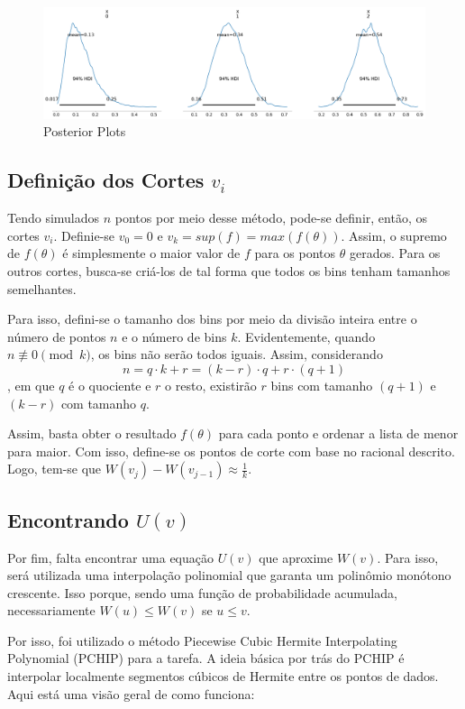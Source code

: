 \documentclass{article}
\begin{document}
\begin{figure}[h]
    \centering
    \includegraphics[width=0.5\linewidth]{Posterior Plots.png}
    \caption{Posterior Plots}
    \label{fig:enter-label}
\end{figure}

\subsection{Definição dos Cortes $v_i$}
Tendo simulados $n$ pontos por meio desse método, pode-se definir, então, os cortes $v_i$. Definie-se $v_0 = 0$ e $v_k = sup(f) = max(f(\theta))$. Assim, o supremo de $f(\theta)$ é simplesmente o maior valor de $f$ para os pontos $\theta$ gerados. Para os outros cortes, busca-se criá-los de tal forma que todos os bins tenham tamanhos semelhantes.

Para isso, defini-se o tamanho dos bins por meio da divisão inteira entre o número de pontos $n$ e o número de bins $k$. Evidentemente, quando $n \not\equiv 0 \pmod{k}$, os bins não serão todos iguais. Assim, considerando $$n = q \cdot k + r =  (k - r) \cdot q + r \cdot (q + 1)$$, em que $q$ é o quociente e $r$ o resto, existirão $r$ bins com tamanho $(q + 1)$ e $(k - r)$ com tamanho $q$.

Assim, basta obter o resultado $f(\theta)$ para cada ponto e ordenar a lista de menor para maior. Com isso, define-se os pontos de corte com base no racional descrito. Logo, tem-se que $W(v_j) - W(v_{j-1}) \approx \frac{1}{k}$.

\subsection{Encontrando $U(v)$}
Por fim, falta encontrar uma equação $U(v)$ que aproxime $W(v)$. Para isso, será utilizada uma interpolação polinomial que garanta um polinômio monótono crescente. Isso porque, sendo uma função de probabilidade acumulada, necessariamente $W(u) \leq W(v)$ se $u \leq v$.

Por isso, foi utilizado o método Piecewise Cubic Hermite Interpolating Polynomial (PCHIP) para a tarefa. A ideia básica por trás do PCHIP é interpolar localmente segmentos cúbicos de Hermite entre os pontos de dados. Aqui está uma visão geral de como funciona:
\end{document}
